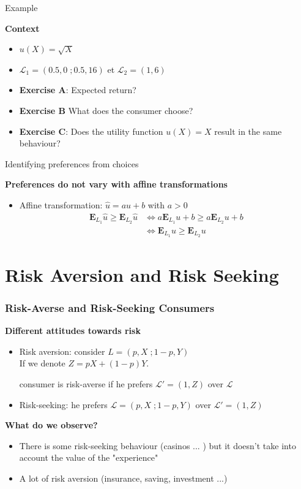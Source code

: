 \documentclass[handout]{beamer}
\newenvironment{iPar}[1]{\textbf{#1} \begin{itemize}}{\end{itemize}}
\newcommand{\esp}{\mathbf{E}} \newcommand{\ul}[1]{\underline{#1}}
\newcommand{\wh}{\widehat}
\newcommand{\mdp}{\medskip \pause}
\begin{document}
\begin{frame}{Example}

\begin{iPar}{Context} \item $u(X) = \sqrt{X}$ \item $\mathcal L_1 =
(0.5,0\;; 0.5,16)$ et $\mathcal L_2 = (1,6)$ \item \textbf{Exercise A}: Expected return? \item
\textbf{Exercise B} What does the consumer choose?  \item \textbf{Exercise C}: Does the utility function $u(X) = X$ result in the same behaviour?\end{iPar}

\end{frame}

\begin{frame}{Identifying preferences from choices}

\begin{iPar}{Preferences do not vary with affine transformations}
\item Affine transformation: $\wh u = a u +b$ with $a>0$
\begin{align*}
\esp_{L_1} \wh u \geq \esp_{L_2} \wh u & \iff  a\esp_{L_1} u + b \geq a\esp_{L_2} u + b \\ & \iff 
 \esp_{L_1} u  \geq \esp_{L_2} u
\end{align*}\mdp

\end{iPar}

\end{frame}

\section{Risk Aversion and Risk Seeking}

\begin{frame}\frametitle{Risk-Averse and Risk-Seeking Consumers}
\begin{iPar}{Different attitudes towards risk} \item Risk aversion: consider $L = (p, X\;; 1-p,Y)$\\
If we denote $Z = p X + (1-p)Y $. \mdp

consumer is risk-averse if he prefers $\mathcal L' = (1,Z)$ over $\mathcal L$  \mdp \item Risk-seeking: he prefers $ \mathcal L = (p, X\;; 1-p,Y) $ over $\mathcal L' =
(1,Z)$ \end{iPar}\mdp

\begin{iPar}{What do we observe?} \item There is some risk-seeking behaviour (casinos
... ) but it doesn't take into account the value of the "experience" \item  A lot of risk aversion (insurance, saving, investment ...) \end{iPar} \end{frame}
\end{document}
